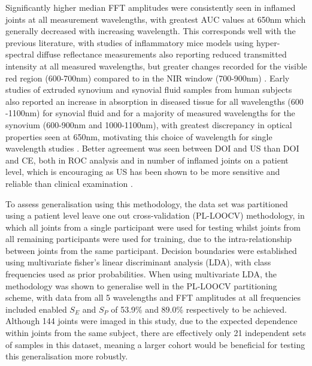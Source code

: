 \documentclass[twoside]{bhamthesis}
\theoremstyle{definition}
\begin{document}
Significantly higher median FFT amplitudes were consistently seen in inflamed joints at all measurement wavelengths, with greatest AUC values at 650nm which generally decreased with increasing wavelength. This corresponds well with the previous literature, with studies of inflammatory mice models using hyper-spectral diffuse reflectance measurements also reporting reduced transmitted intensity at all measured wavelengths, but greater changes recorded for the visible red region (600-700nm) compared to in the NIR window (700-900nm) \cite{glinton2017diagnosing}. Early studies of extruded synovium and synovial fluid samples from human subjects also reported an increase in absorption in diseased tissue for all wavelengths (600 -1100nm) for synovial fluid and for a majority of measured wavelengths for the synovium (600-900nm and 1000-1100nm)\cite{beuthan1996diagnosis}, with greatest discrepancy in optical properties seen at 650nm, motivating this choice of wavelength for single wavelength studies \cite{hielscher2004sagittal}. Better agreement was seen between DOI and US than DOI and CE, both in ROC analysis and in number of inflamed joints on a patient level, which is encouraging as US has been shown to be more sensitive and reliable than clinical examination \cite{wakefield2004should,scheel2006prospective,naredo2005assessment}.

To assess generalisation using this methodology, the data set was partitioned using a patient level leave one out cross-validation (PL-LOOCV) methodology, in which all joints from a single participant were used for testing whilst joints from all remaining participants were used for training, due to the intra-relationship between joints from the same participant. Decision boundaries were established using multivariate fisher's linear discriminant analysis (LDA), with class frequencies used as prior probabilities. When using multivariate LDA, the methodology was shown to generalise well in the PL-LOOCV partitioning scheme, with data from all 5 wavelengths and FFT amplitudes at all frequencies included enabled $S_E$ and $S_P$ of 53.9\% and 89.0\% respectively to be achieved. Although 144 joints were imaged in this study, due to the expected dependence within joints from the same subject, there are effectively only 21 independent sets of samples in this dataset, meaning a larger cohort would be beneficial for testing this generalisation more robustly.

\end{document}
